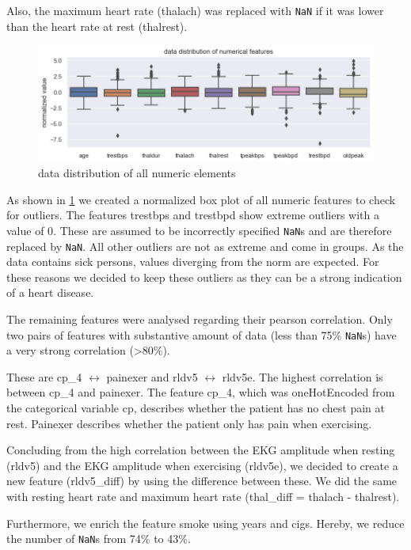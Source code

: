 Also, the maximum heart rate (thalach) was replaced with \texttt{NaN} if it was lower than the heart rate at rest (thalrest).

\begin{figure}[h]
	\centering
	\includegraphics[width=\textwidth]{images/dataDistribution.png}
	\caption{data distribution of all numeric elements}
	\label{fig:dataDistribution}
\end{figure}
As shown in \cref{fig:dataDistribution} we created a normalized box plot of all numeric features to check for outliers. The features trestbps and trestbpd show extreme outliers with a value of 0. These are assumed to be incorrectly specified \texttt{NaN}s and are therefore replaced by \texttt{NaN}. All other outliers are not as extreme and come in groups. As the data contains sick persons, values diverging from the norm are expected. For these reasons we decided to keep these outliers as they can be a strong indication of a heart disease.

The remaining features were analysed regarding their pearson correlation. Only two pairs of features with substantive amount of data (less than 75\% \texttt{NaN}s) have a very strong correlation (>80\%).  

These are cp\_4 $\leftrightarrow$ painexer and rldv5 $\leftrightarrow$ rldv5e. The highest correlation is between cp\_4 and painexer. The feature cp\_4, which was oneHotEncoded from the categorical variable cp, describes whether the patient has no chest pain at rest. Painexer describes whether the patient only has pain when exercising. 

Concluding from the high correlation between the EKG amplitude when resting (rldv5) and the EKG amplitude when exercising (rldv5e), we decided to create a new feature (rldv5\_diff) by using the difference between these. We did the same with resting heart rate and maximum heart rate (thal\_diff = thalach - thalrest). 

Furthermore, we enrich the feature smoke using years and cigs. Hereby, we reduce the number of \texttt{NaN}s from 74\% to 43\%. 

